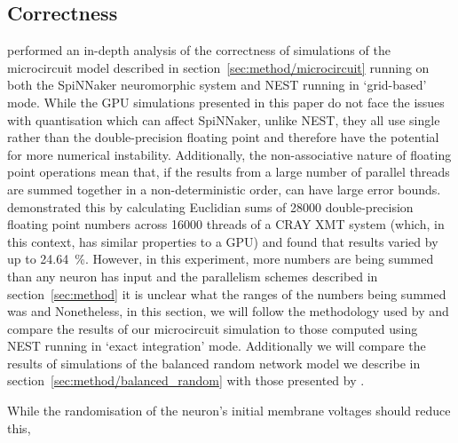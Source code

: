 \documentclass[utf8]{frontiersSCNS} %
\begin{document}
\subsection{Correctness}
\citet{VanAlbada2018} performed an in-depth analysis of the correctness of simulations of the microcircuit model described in section~\ref{sec:method/microcircuit} running on both the SpiNNaker neuromorphic system and NEST running in `grid-based' mode.
While the GPU simulations presented in this paper do not face the issues with quantisation which can affect SpiNNaker, unlike NEST, they all use single rather than the double-precision floating point and therefore have the potential for more numerical instability.
Additionally, the non-associative nature of floating point operations mean that, if the results from a large number of parallel threads are summed together in a non-deterministic order, can have large error bounds.
\citet{Villa2009} demonstrated this by calculating Euclidian sums of \num{28000} double-precision floating point numbers across \num{16000} threads of a CRAY XMT system (which, in this context, has similar properties to a GPU) and found that results varied by up to \SI{24.64}{\percent}.
However, in this experiment, more numbers are being summed than any neuron has input and the parallelism schemes described in section~\ref{sec:method} it is unclear what the ranges of the numbers being summed was and
Nonetheless, in this section, we will follow the methodology used by \citet{VanAlbada2018} and compare the results of our microcircuit simulation to those computed using NEST running in `exact integration' mode.
Additionally we will compare the results of simulations of the balanced random network model we describe in section~\ref{sec:method/balanced_random} with those presented by \citet{Morrison2007}.

While the randomisation of the neuron's initial membrane voltages should reduce this, 
\end{document}

